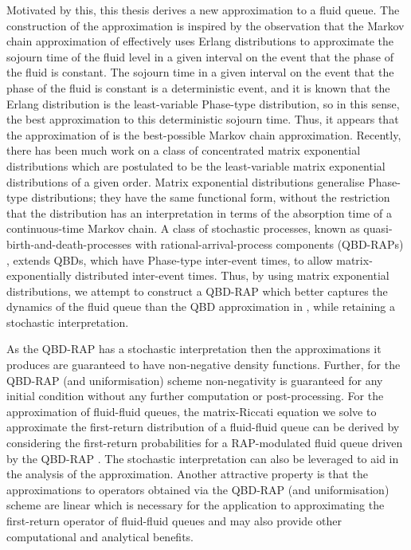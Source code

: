 Motivated by this, this thesis derives a new approximation to a fluid queue. The construction of the approximation is inspired by the observation that the Markov chain approximation of \cite{bo2013} effectively uses Erlang distributions to approximate the sojourn time of the fluid level in a given interval on the event that the phase of the fluid is constant. The sojourn time in a given interval on the event that the phase of the fluid is constant is a deterministic event, and it is known that the Erlang distribution is the least-variable Phase-type distribution, so in this sense, the best approximation to this deterministic sojourn time. Thus, it appears that the approximation of \cite{bo2013} is the best-possible Markov chain approximation. Recently, there has been much work on a class of concentrated matrix exponential distributions \citep{hhat2020} which are postulated to be the least-variable matrix exponential distributions of a given order. Matrix exponential distributions generalise Phase-type distributions; they have the same functional form, without the restriction that the distribution has an interpretation in terms of the absorption time of a continuous-time Markov chain. A class of stochastic processes, known as quasi-birth-and-death-processes with rational-arrival-process components (QBD-RAPs) \citep{bn2010}, extends QBDs, which have Phase-type inter-event times, to allow matrix-exponentially distributed inter-event times. Thus, by using matrix exponential distributions, we attempt to construct a QBD-RAP which better captures the dynamics of the fluid queue than the QBD approximation in \cite{bo2013}, while retaining a stochastic interpretation. 

As the QBD-RAP has a stochastic interpretation then the approximations it produces are guaranteed to have non-negative density functions. Further, for the QBD-RAP (and uniformisation) scheme non-negativity is guaranteed for any initial condition without any further computation or post-processing. For the approximation of fluid-fluid queues, the matrix-Riccati equation we solve to approximate the first-return distribution of a fluid-fluid queue can be derived by considering the first-return probabilities for a RAP-modulated fluid queue driven by the QBD-RAP \citep{p2019,bgnp2021}. The stochastic interpretation can also be leveraged to aid in the analysis of the approximation. Another attractive property is that the approximations to operators obtained via the QBD-RAP (and uniformisation) scheme are linear which is necessary for the application to approximating the first-return operator of fluid-fluid queues and may also provide other computational and analytical benefits. 

